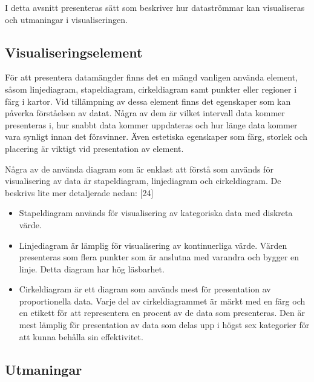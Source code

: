 \documentclass[12pt]{kththesis}
\begin{document}
I detta avsnitt presenteras sätt som beskriver hur dataströmmar kan visualiseras och utmaningar i visualiseringen. 

\subsection{Visualiseringselement}

För att presentera datamängder finns det en mängd vanligen använda element, såsom linjediagram, stapeldiagram, cirkeldiagram samt punkter eller regioner i färg i kartor. Vid tillämpning av dessa element finns det egenskaper som kan påverka förståelsen av datat. Några av dem är vilket intervall data kommer presenteras i, hur snabbt data kommer uppdateras och hur länge data kommer vara synligt innan det försvinner. Även estetiska egenskaper som färg, storlek och placering är viktigt vid presentation av element.

Några av de använda diagram som är enklast att förstå som används för visualisering av data är stapeldiagram, linjediagram och cirkeldiagram. De beskrivs lite mer detaljerade nedan: [24]
\begin{itemize}
\item Stapeldiagram används för visualisering av kategoriska data med diskreta värde.
\item Linjediagram är lämplig för visualisering av kontinuerliga värde. Värden presenteras som flera punkter som är anslutna med varandra och bygger en linje. Detta diagram har hög läsbarhet.
\item Cirkeldiagram är ett diagram som används mest för presentation av proportionella data. Varje del av cirkeldiagrammet är märkt med en färg och en etikett för att representera en procent av de data som presenteras. Den är mest lämplig för presentation av data som delas upp i högst sex kategorier för att kunna behålla sin effektivitet. 
\end{itemize}	

\subsection{Utmaningar}
\end{document}
